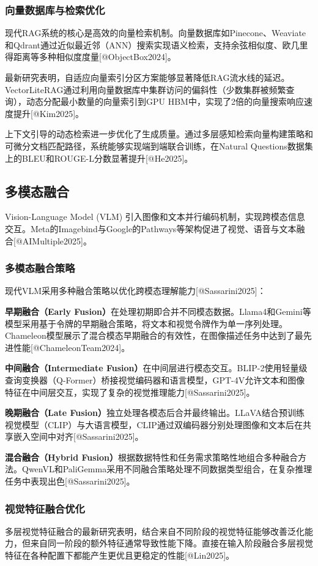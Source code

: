 \documentclass{article}
\begin{document}
\subsubsection{向量数据库与检索优化}
现代RAG系统的核心是高效的向量检索机制。向量数据库如Pinecone、Weaviate和Qdrant通过近似最近邻（ANN）搜索实现语义检索，支持余弦相似度、欧几里得距离等多种相似度度量[@ObjectBox2024]。

最新研究表明，自适应向量索引分区方案能够显著降低RAG流水线的延迟。VectorLiteRAG通过利用向量数据库中集群访问的偏斜性（少数集群被频繁查询），动态分配最小数量的向量索引到GPU HBM中，实现了2倍的向量搜索响应速度提升[@Kim2025]。

上下文引导的动态检索进一步优化了生成质量。通过多层感知检索向量构建策略和可微分文档匹配路径，系统能够实现端到端联合训练，在Natural Questions数据集上的BLEU和ROUGE-L分数显著提升[@He2025]。

\subsection{多模态融合}
Vision-Language Model (VLM) 引入图像和文本并行编码机制，实现跨模态信息交互。Meta的Imagebind与Google的Pathways等架构促进了视觉、语音与文本融合[@AIMultiple2025]。

\subsubsection{多模态融合策略}
现代VLM采用多种融合策略以优化跨模态理解能力[@Sassarini2025]：

\textbf{早期融合（Early Fusion）}在处理初期即合并不同模态数据。Llama4和Gemini等模型采用基于令牌的早期融合策略，将文本和视觉令牌作为单一序列处理。Chameleon模型展示了混合模态早期融合的有效性，在图像描述任务中达到了最先进性能[@ChameleonTeam2024]。

\textbf{中间融合（Intermediate Fusion）}在中间层进行模态交互。BLIP-2使用轻量级查询变换器（Q-Former）桥接视觉编码器和语言模型，GPT-4V允许文本和图像特征在中间层交互，实现了复杂的视觉推理能力[@Sassarini2025]。

\textbf{晚期融合（Late Fusion）}独立处理各模态后合并最终输出。LLaVA结合预训练视觉模型（CLIP）与大语言模型，CLIP通过双编码器分别处理图像和文本后在共享嵌入空间中对齐[@Sassarini2025]。

\textbf{混合融合（Hybrid Fusion）}根据数据特性和任务需求策略性地组合多种融合方法。QwenVL和PaliGemma采用不同融合策略处理不同数据类型组合，在复杂推理任务中表现出色[@Sassarini2025]。

\subsubsection{视觉特征融合优化}
多层视觉特征融合的最新研究表明，结合来自不同阶段的视觉特征能够改善泛化能力，但来自同一阶段的额外特征通常导致性能下降。直接在输入阶段融合多层视觉特征在各种配置下都能产生更优且更稳定的性能[@Lin2025]。
\end{document}
